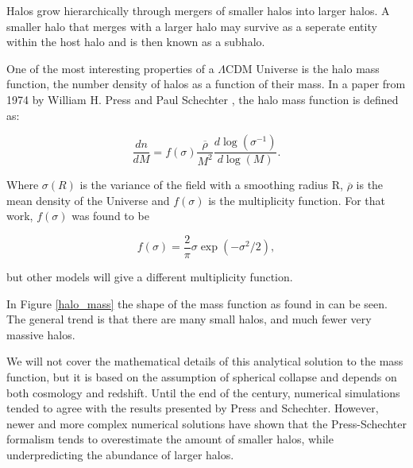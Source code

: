 Halos grow hierarchically through mergers of smaller halos into larger halos. A smaller halo that merges with a larger halo may survive as a seperate entity within the host halo and is then known as a subhalo. 

One of the most interesting properties of a $\Lambda$CDM Universe is the halo mass function, the number density of halos as a function of their mass. In a paper from 1974 by William H. Press and Paul Schechter \parencite{Press1974}, the halo mass function is defined as:

\begin{equation}
    \frac{dn}{dM} = f(\sigma)\frac{\overline{\rho}}{M^2}\frac{d\log(\sigma^{-1})}{d\log(M)}.
\end{equation}

Where $\sigma (R)$ is the variance of the field with a smoothing radius R, $\overline{\rho}$ is the mean density of the Universe and $f(\sigma)$ is the multiplicity function. For that work, $f(\sigma)$ was found to be

\begin{equation}
    f(\sigma) = \frac{2}{\pi} \sigma \exp(-\sigma^2/2),
\end{equation}

but other models will give a different multiplicity function.

In Figure \ref{halo_mass} the shape of the mass function as found in \cite{Tinker2008} can be seen. The general trend is that there are many small halos, and much fewer very massive halos. 

We will not cover the mathematical details of this analytical solution to the mass function, but it is based on the assumption of spherical collapse and depends on both cosmology and redshift.
Until the end of the century, numerical simulations tended to agree with the results presented by Press and Schechter. However, newer and more complex numerical solutions have shown that the Press-Schechter formalism tends to overestimate the amount of smaller halos, while underpredicting the abundance of larger halos.

